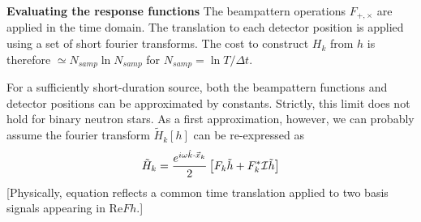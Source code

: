 \documentclass[twocolumn,prd,nofootinbib]{revtex4}
\begin{document}
\begin{shaded}
\noindent \textbf{Evaluating the response functions}
The beampattern operations $F_{+,\times}$ are applied in the time domain. The translation to each detector position is
applied using a set of short fourier transforms.  The cost to construct $H_k$ from $h$ is therefore  $\simeq N_{samp}\ln
N_{samp}$ for $N_{samp} = \ln
T/\Delta t$.

For a sufficiently short-duration source, both the beampattern functions and detector positions can be approximated by
constants.  Strictly, this limit does not hold for binary neutron stars.  As a first approximation, however, we can
probably assume  the fourier transform $\tilde{H}_k[h]$ can be re-expressed as 
\begin{eqnarray}
\tilde{H}_k = \frac{e^{i\omega \hat{k}\cdot \vec{x}_k}}{2}\left[ 
   F_k  \tilde{h} + F_k^* {\cal I} \tilde{h} 
 \right]
\end{eqnarray}
[Physically, equation reflects a common time translation applied to two basis signals appearing in  $\text{Re} F h$.]
\end{shaded}
\end{document}
